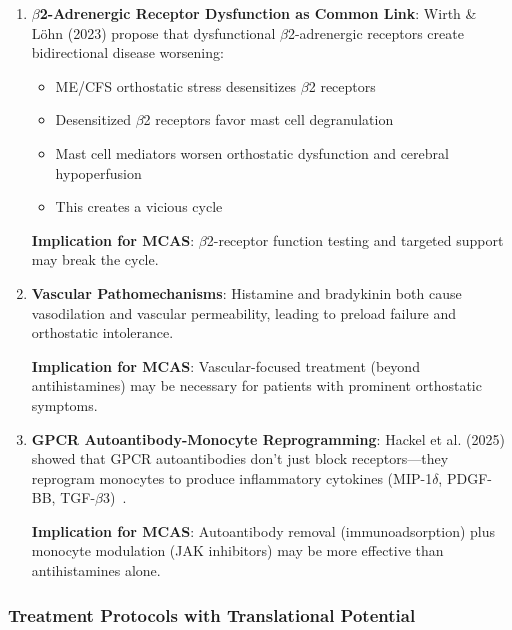 \begin{enumerate}
    \item \textbf{$\beta$2-Adrenergic Receptor Dysfunction as Common Link}: Wirth \& Löhn (2023) propose that dysfunctional $\beta$2-adrenergic receptors create bidirectional disease worsening:
    \begin{itemize}
        \item ME/CFS orthostatic stress desensitizes $\beta$2 receptors
        \item Desensitized $\beta$2 receptors favor mast cell degranulation
        \item Mast cell mediators worsen orthostatic dysfunction and cerebral hypoperfusion
        \item This creates a vicious cycle
    \end{itemize}

    \textbf{Implication for MCAS}: $\beta$2-receptor function testing and targeted support may break the cycle.

    \item \textbf{Vascular Pathomechanisms}: Histamine and bradykinin both cause vasodilation and vascular permeability, leading to preload failure and orthostatic intolerance.

    \textbf{Implication for MCAS}: Vascular-focused treatment (beyond antihistamines) may be necessary for patients with prominent orthostatic symptoms.

    \item \textbf{GPCR Autoantibody-Monocyte Reprogramming}: Hackel et al. (2025) showed that GPCR autoantibodies don't just block receptors---they reprogram monocytes to produce inflammatory cytokines (MIP-1$\delta$, PDGF-BB, TGF-$\beta$3)~\cite{Hackel2025monocyte}.

    \textbf{Implication for MCAS}: Autoantibody removal (immunoadsorption) plus monocyte modulation (JAK inhibitors) may be more effective than antihistamines alone.
\end{enumerate}

\subsubsection{Treatment Protocols with Translational Potential}

